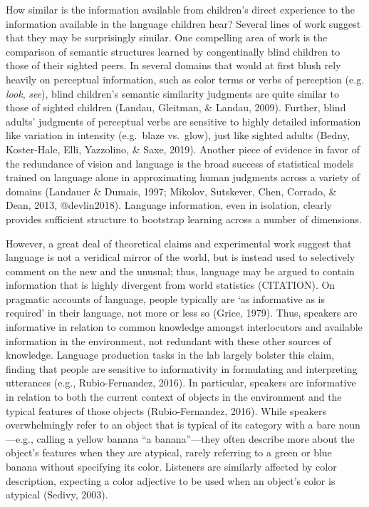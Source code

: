 \documentclass[10pt, letterpaper]{article}
\begin{document}
How similar is the information available from children's direct
experience to the information available in the language children hear?
Several lines of work suggest that they may be surprisingly similar. One
compelling area of work is the comparison of semantic structures learned
by congentinally blind children to those of their sighted peers. In
several domains that would at first blush rely heavily on perceptual
information, such as color terms or verbs of perception (e.g.
\emph{look}, \emph{see}), blind children's semantic similarity judgments
are quite similar to those of sighted children (Landau, Gleitman, \&
Landau, 2009). Further, blind adults' judgments of perceptual verbs are
sensitive to highly detailed information like variation in intensity
(e.g.~blaze vs.~glow), just like sighted adults (Bedny, Koster-Hale,
Elli, Yazzolino, \& Saxe, 2019). Another piece of evidence in favor of
the redundance of vision and language is the broad success of
statistical models trained on language alone in approximating human
judgments across a variety of domains (Landauer \& Dumais, 1997;
Mikolov, Sutskever, Chen, Corrado, \& Dean, 2013, @devlin2018). Language
information, even in isolation, clearly provides sufficient structure to
bootstrap learning across a number of dimensions.

However, a great deal of theoretical claims and experimental work
suggest that language is not a veridical mirror of the world, but is
instead used to selectively comment on the new and the unusual; thus,
language may be argued to contain information that is highly divergent
from world statistics (CITATION). On pragmatic accounts of language,
people typically are `as informative as is required' in their language,
not more or less so (Grice, 1979). Thus, speakers are informative in
relation to common knowledge amongst interlocutors and available
information in the environment, not redundant with these other sources
of knowledge. Language production tasks in the lab largely bolster this
claim, finding that people are sensitive to informativity in formulating
and interpreting utterances (e.g., Rubio-Fernandez, 2016). In
particular, speakers are informative in relation to both the current
context of objects in the environment and the typical features of those
objects (Rubio-Fernandez, 2016). While speakers overwhelmingly refer to
an object that is typical of its category with a bare noun---e.g.,
calling a yellow banana ``a banana''---they often describe more about
the object's features when they are atypical, rarely referring to a
green or blue banana without specifying its color. Listeners are
similarly affected by color description, expecting a color adjective to
be used when an object's color is atypical (Sedivy, 2003).
\end{document}
